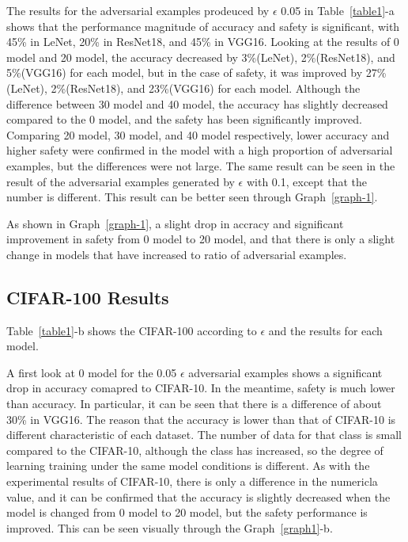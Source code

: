 \documentclass[journal,article,submit,moreauthors,pdftex]{Definitions/mdpi}
\begin{document}
The results for the adversarial examples prodeuced by \begin{math}\epsilon\end{math} 0.05 in Table~\ref{table1}-a shows that the performance magnitude of accuracy and safety is significant, with 45\%  in LeNet, 20\% in ResNet18, and 45\% in VGG16.
Looking at the results of 0 model and 20 model, the accuracy decreased by 3\%(LeNet), 2\%(ResNet18), and 5\%(VGG16) for each model, but in the case of safety, it was improved by 27\%(LeNet), 2\%(ResNet18), and 23\%(VGG16) for each model.
Although the difference between 30 model and 40 model, the accuracy has slightly decreased compared to the 0 model, and the safety has been significantly improved.
Comparing 20 model, 30 model, and 40 model respectively, lower accuracy and higher safety were confirmed in the model with a high proportion of adversarial examples, but the differences were not large.
The same result can be seen in the result of the adversarial examples generated by \begin{math}\epsilon\end{math} with 0.1, except that the number is different. This result can be better seen through Graph~\ref{graph-1}.

As shown in Graph~\ref{graph-1}, a slight drop in accracy and significant improvement in safety from 0 model to 20 model, and that there is only a slight change in models that have increased to ratio of adversarial examples.

\subsection{CIFAR-100 Results}

Table~\ref{table1}-b shows the CIFAR-100 according to \begin{math}\epsilon\end{math} and the results for each model.

A first look at 0 model for the 0.05 \begin{math}\epsilon\end{math} adversarial examples shows a significant drop in accuracy comapred to CIFAR-10.
In the meantime, safety is much lower than accuracy. In particular, it can be seen that there is a difference of about 30\% in VGG16.
The reason that the accuracy is lower than that of CIFAR-10 is different characteristic of each dataset. The number of data for that class is small compared to the CIFAR-10, although the class has increased, so the degree of learning training under the same model conditions is different.
As with the experimental results of CIFAR-10, there is only a difference in the numericla value, and it can be confirmed that the accuracy is slightly decreased when the model is changed from 0 model to 20 model, but the safety performance is improved. 
This can be seen visually through the Graph~\ref{graph1}-b.
\end{document}
